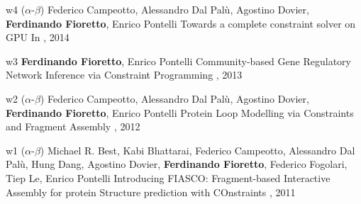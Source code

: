 \begin{pubs}
\wsentry 
	{w4} %
	{($\alpha$-$\beta$) Federico Campeotto, Alessandro Dal Pal\`{u}, Agostino Dovier, {\bf Ferdinando Fioretto}, Enrico Pontelli}
	{Towards a complete constraint solver on GPU}
	{In , 2014}
	{~}

\wsentry 
	{w3} %
	{{\bf Ferdinando Fioretto}, Enrico Pontelli}
	{Community-based Gene Regulatory Network Inference via Constraint Programming}
	{, 2013}
	{~} 

\wsentry
	{w2} %
	{($\alpha$-$\beta$) 
	Federico Campeotto, Alessandro Dal Pal\`{u}, Agostino Dovier, {\bf Ferdinando Fioretto}, Enrico Pontelli}
	{Protein Loop Modelling via Constraints and Fragment Assembly}
	{, 2012}
	{~} 

\wsentry 
	{w1} %
	{($\alpha$-$\beta$) 
	Michael R. Best, Kabi Bhattarai, Federico Campeotto, Alessandro Dal Pal\`{u}, Hung Dang, Agostino Dovier, {\bf Ferdinando Fioretto}, Federico Fogolari, Tiep Le, Enrico Pontelli}
		{Introducing FIASCO: Fragment-based Interactive Assembly for protein Structure prediction with COnstraints}
 	 {, 2011}
  	{~}
\end{pubs}

